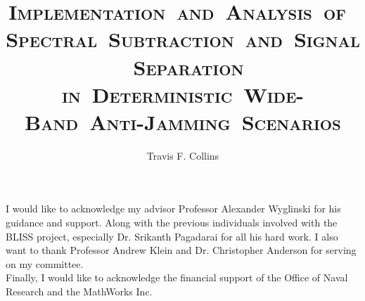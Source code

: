 \documentclass[11pt]{mvlthesis}
\title{\scshape \mbox{Implementation and Analysis of Spectral Subtraction and Signal Separation}\\
\scshape \mbox{in Deterministic Wide-Band Anti-Jamming Scenarios}}
\author{Travis F. Collins}
\begin{document}
\maketitle

\begin{abstract}



\end{abstract}


\begin{frontmatter}

\begin{acknowledgements}
\begin{center}
\vspace{0.4in}

I would like to acknowledge my advisor Professor Alexander Wyglinski for his guidance and support. Along with the previous individuals involved with the BLISS project, especially Dr. Srikanth Pagadarai for all his hard work.  I also want to thank Professor Andrew Klein and Dr. Christopher Anderson for serving on my committee.\\

Finally, I would like to acknowledge the financial support of the Office of Naval Research and the MathWorks Inc.


\end{center}
\end{acknowledgements}
\tableofcontents
\listoffigures
\listoftables

\end{frontmatter}



%



%


%


\end{document}
